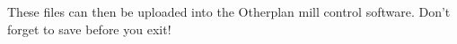 \documentclass[12pt, oneside]{article}
\begin{document}
These files can then be uploaded into the Otherplan mill control software. Don't forget to save before you exit!

\end{document}
